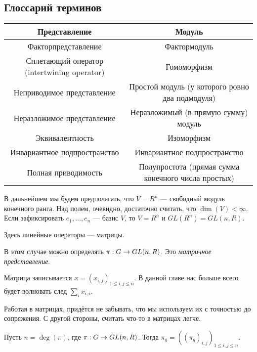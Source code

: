 \subsection{Глоссарий терминов}
\begin{tabular}{|c|c|}
    \hline
    Представление                               & Модуль                                              \\\hline
    Факторпредставление                         & Фактормодуль                                        \\\hline
    Сплетающий оператор (intertwining operator) & Гомоморфизм                                         \\\hline
    Неприводимое представление                  & Простой модуль (у которого ровно два подмодуля)     \\\hline
    Неразложимое представление                  & Неразложимый (в прямую сумму) модуль                \\\hline
    Эквивалентность                             & Изоморфизм                                          \\\hline
    Инвариантное подпространство                & Инвариантное подпространство                        \\\hline
    Полная приводимость                         & Полупростота (прямая сумма конечного числа простых) \\\hline
\end{tabular}

В дальнейшем мы будем предполагать, что $V = R^n$ --- свободный модуль конечного ранга.
Над полем, очевидно, достаточно считать, что $\dim(V) < \infty$.
Если зафиксировать $e_1, \dots, e_n$ --- базис $V$, то $V = R^n$ и $GL(R^n) = GL(n, R)$.

Здесь линейные операторы --- матрицы.

В этом случае можно определять $\pi: G \rightarrow GL(n, R)$.
Это \textit{матричное представление}.

\ok
Матрица записывается $x = (x_{i,j})_{1 \le i,j \le n}$.
В данной главе нас больше всего будет волновать след $\sum\limits_{i}x_{i,i}$.

Работая в матрицах, придётся не забывать, что мы используем их с точностью до сопряжения.
С другой стороны, считать что-то в матрицах легче.

Пусть $n = \deg(\pi)$, где $\pi: G \rightarrow GL(n, R)$.
Тогда $\pi_g = ((\pi_g)_{i,j})_{1 \le i,j \le n}$.

